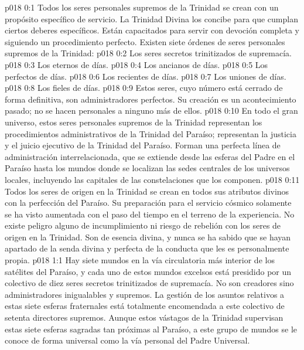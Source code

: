 \author{Consejero divino}
\vs p018 0:1 Todos los seres personales supremos de la Trinidad se crean con un propósito específico de servicio. La Trinidad Divina los concibe para que cumplan ciertos deberes específicos. Están capacitados para servir con devoción completa y siguiendo un procedimiento perfecto. Existen siete órdenes de seres personales supremos de la Trinidad:
\vs p018 0:2 Los seres secretos trinitizados de supremacía.
\vs p018 0:3 Los eternos de días.
\vs p018 0:4 Los ancianos de días.
\vs p018 0:5 Los perfectos de días.
\vs p018 0:6 Los recientes de días.
\vs p018 0:7 Los uniones de días.
\vs p018 0:8 Los fieles de días.
\vs p018 0:9 \pc Estos seres, cuyo número está cerrado de forma definitiva, son administradores perfectos. Su creación es un acontecimiento pasado; no se hacen personales a ninguno más de ellos.
\vs p018 0:10 En todo el gran universo, estos seres personales supremos de la Trinidad representan los procedimientos administrativos de la Trinidad del Paraíso; representan la justicia y  el juicio ejecutivo de la Trinidad del Paraíso. Forman una perfecta línea de administración interrelacionada, que se extiende desde las esferas del Padre en el Paraíso hasta los mundos donde se localizan las sedes centrales de los universos locales, incluyendo las capitales de las constelaciones que los componen.
\vs p018 0:11 Todos los seres de origen en la Trinidad se crean en todos sus atributos divinos con la perfección del Paraíso. Su preparación para el servicio cósmico solamente se ha visto aumentada con el paso del tiempo en el terreno de la experiencia. No existe peligro alguno de incumplimiento ni riesgo de rebelión con los seres de origen en la Trinidad. Son de esencia divina, y nunca se ha sabido que se hayan apartado de la senda divina y perfecta de la conducta que les es personalmente propia.
\vs p018 1:1 Hay siete mundos en la vía circulatoria más interior de los satélites del Paraíso, y cada uno de estos mundos excelsos está presidido por un colectivo de diez seres secretos trinitizados de supremacía. No son creadores sino administradores inigualables y supremos. La gestión de los asuntos relativos a estas siete esferas fraternales está totalmente encomendada a este colectivo de setenta directores supremos. Aunque estos vástagos de la Trinidad supervisan estas siete esferas sagradas tan próximas al Paraíso, a este grupo de mundos se le conoce de forma universal como la vía personal del Padre Universal.
